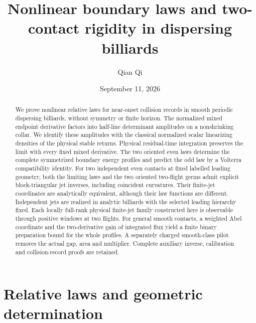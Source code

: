 
\title[Nonlinear boundary laws and two-contact rigidity]{Nonlinear boundary laws and two-contact rigidity
in dispersing billiards}
\author{Qian Qi}
\date{September 11, 2026}

\begin{abstract}
We prove nonlinear relative laws for near-onset collision records in
smooth periodic dispersing billiards, without symmetry or finite horizon.
The normalized mixed endpoint derivative factors into half-line
determinant amplitudes on a nonshrinking collar. We identify these
amplitudes with the classical normalized scalar linearizing densities
of the physical stable returns. Physical residual-time integration preserves
the limit with every fixed mixed derivative. The two oriented even laws determine the complete
symmetrized boundary energy profiles and predict the odd law by a
Volterra compatibility identity. For two independent even contacts at
fixed labelled leading geometry, both the limiting laws and the two
oriented two-flight germs admit explicit block-triangular jet inverses,
including coincident curvatures. Their finite-jet coordinates are
analytically equivalent, although their law functions are different.
Independent jets are realized in analytic billiards with the selected
leading hierarchy fixed. Each locally full-rank physical finite-jet
family constructed here is observable through positive windows at two
flights. For general smooth
contacts, a weighted Abel coordinate and the two-derivative gain of
integrated flux yield a finite binary preparation bound for the whole
profiles. A separately charged smooth-class pilot removes the actual
gap, area and multiplier. Complete auxiliary inverse, calibration and
collision-record proofs are retained.
\end{abstract}
\maketitle

\part{Relative laws and geometric determination}











